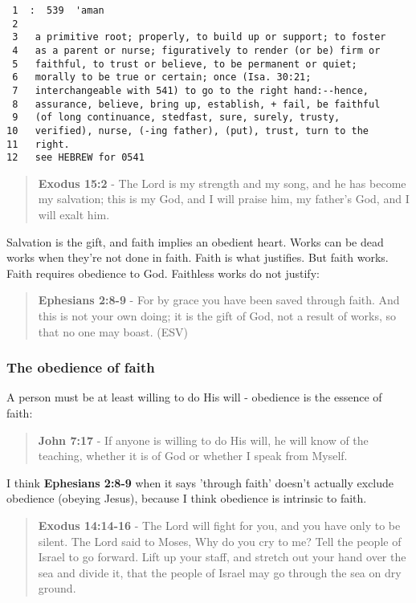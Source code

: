 \documentclass[11pt]{article}
\begin{document}
\begin{verbatim}
 1  :  539  'aman
 2  
 3   a primitive root; properly, to build up or support; to foster
 4   as a parent or nurse; figuratively to render (or be) firm or
 5   faithful, to trust or believe, to be permanent or quiet;
 6   morally to be true or certain; once (Isa. 30:21;
 7   interchangeable with 541) to go to the right hand:--hence,
 8   assurance, believe, bring up, establish, + fail, be faithful
 9   (of long continuance, stedfast, sure, surely, trusty,
10   verified), nurse, (-ing father), (put), trust, turn to the
11   right.
12   see HEBREW for 0541
\end{verbatim}

\begin{quote}
\textbf{Exodus 15:2} - The Lord is my strength and my song, and he has become my salvation; this is my God, and I will praise him, my father's God, and I will exalt him.
\end{quote}

Salvation is the gift, and faith implies an obedient heart. Works can be dead works when they're not done in faith. Faith is what justifies. But faith works. Faith requires obedience to God. Faithless works do not justify:

\begin{quote}
\textbf{Ephesians 2:8-9} - For by grace you have been saved through faith. And this is not your own doing; it is the gift of God, not a result of works, so that no one may boast. (ESV)
\end{quote}

\subsubsection{The obedience of faith}
\label{sec:org7c04f22}

A person must be at least willing to do His will - obedience is the essence of faith:

\begin{quote}
\textbf{John 7:17} - If anyone is willing to do His will, he will know of the teaching, whether it is of God or whether I speak from Myself.
\end{quote}

I think \textbf{Ephesians 2:8-9} when it says 'through faith' doesn't actually exclude obedience (obeying Jesus), because I think obedience is intrinsic to faith.

\begin{quote}
\textbf{Exodus 14:14-16} - The Lord will fight for you, and you have only to be silent.  The Lord said to Moses, Why do you cry to me? Tell the people of Israel to go forward.  Lift up your staff, and stretch out your hand over the sea and divide it, that the people of Israel may go through the sea on dry ground.
\end{quote}
\end{document}
